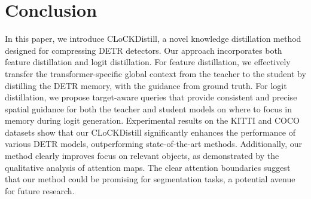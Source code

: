 \section{Conclusion}

In this paper, we introduce CLoCKDistill, a novel knowledge distillation method designed for compressing DETR detectors. Our approach incorporates both feature distillation and logit distillation. For feature distillation, we effectively transfer the transformer-specific global context from the teacher to the student by distilling the DETR memory, with the guidance from ground truth. For logit distillation, we propose target-aware queries that provide consistent and precise spatial guidance for both the teacher and student models on where to focus in memory during logit generation. Experimental results on the KITTI and COCO datasets show that our CLoCKDistill significantly enhances the performance of various DETR models, outperforming state-of-the-art methods. Additionally, our method clearly improves focus on relevant objects, as demonstrated by the qualitative analysis of attention maps. The clear attention boundaries suggest that our method could be promising for segmentation tasks, a potential avenue for future research.